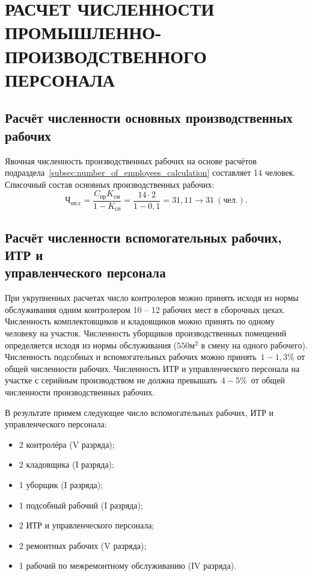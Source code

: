 \section[Расчёт численности промышленно-производственного персонала]
{РАСЧЕТ ЧИСЛЕННОСТИ \\ ПРОМЫШЛЕННО-ПРОИЗВОДСТВЕННОГО \\ ПЕРСОНАЛА}
\label{sec:number}

\subsection[Расчёт численности основных производственных рабочих]
{Расчёт численности основных производственных рабочих}

Явочная численность производственных рабочих на основе расчётов
подраздела~\ref{subsec:number_of_employees_calculation} составляет 14 человек.
Списочный состав основных производственных рабочих:
\begin{equation*}
  \text{Ч}_{\text{оп.с}} =
    \dfrac{C_{\text{пр}}K_{см}}{1-K_{\text{сп}}} =
    \dfrac{14 \cdot 2}{1-0{,}1} =
    31{,}11 \rightarrow 31~(\text{чел.}).
\end{equation*}


\subsection[Расчёт численности вспомогательных рабочих, ИТР и УП]
{Расчёт численности вспомогательных рабочих, ИТР и \\
управленческого персонала}

При укрупненных расчетах число контролеров можно принять исходя из нормы
обслуживания одним контролером 10 -- 12 рабочих мест в сборочных цехах.
Численность комплектовщиков и кладовщиков можно принять по одному человеку
на участок. Численность уборщиков производственных
помещений определяется исходя из нормы обслуживания ($550 \text{м}^2$ в смену
на одного рабочего). Численность подсобных и вспомогательных рабочих можно
принять~$1-1{,}3\%$ от общей численности рабочих.
Численность ИТР и управленческого персонала на участке с серийным производством
не должна превышать~$4-5\%$~от общей численности производственных рабочих.

В результате примем следующее число вспомогательных рабочих,
ИТР и управленческого персонала:

\begin{itemize}
  \item 2 контролёра (V разряда);
  \item 2 кладовщика (I разряда);
  \item 1 уборщик (I разряда);
  \item 1 подсобный рабочий (I разряда);
  \item 2 ИТР и управленческого персонала;
  \item 2 ремонтных рабочих (V разряда);
  \item 1 рабочий по межремонтному обслуживанию (IV разряда).
\end{itemize}

